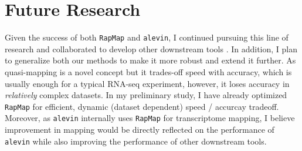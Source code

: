 \documentclass[11pt,a4paper,sans]{moderncv} %
\newcommand{\qm}{quasi-mapping\xspace}
\newcommand{\rapmap}{\texttt{RapMap}\xspace}
\newcommand{\alevin}{\texttt{alevin}\xspace}
\begin{document}
\section{Future Research}
Given the success of both \rapmap and \alevin, I continued pursuing this line of research and 
collaborated to develop other downstream tools \cite{rapclust, ddfact, pufferfish, swish, minnow}. 
In addition, I plan to generalize both our methods to make it more robust and extend it further. 
As \qm is a novel concept but it trades-off speed with accuracy, which is usually enough for a typical 
RNA-seq experiment, however, it loses accuracy in \textit{relatively} complex datasets. 
In my preliminary study, I have already optimized \rapmap for efficient, dynamic (dataset dependent) 
speed / accurcay tradeoff. Moreover, as \alevin internally uses \rapmap for transcriptome mapping, I believe 
improvement in mapping would be directly reflected on the performance of \alevin while also improving the 
performance of other downstream tools.
\end{document}
